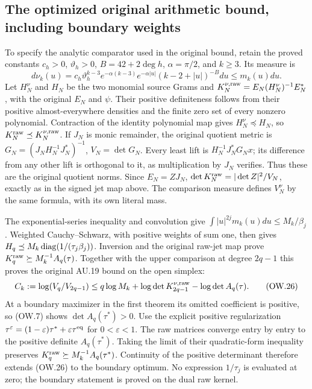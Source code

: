 \subsection{The optimized original arithmetic bound, including boundary weights}

To specify the analytic comparator used in the original bound, retain
the proved constants $c_h>0$, $\vartheta_h>0$, $B=42+2\deg h$,
$\alpha=\pi/2$, and $k\ge3$. Its measure is
\[
 d\nu_k(u)=c_h\vartheta_h^{k-3}e^{-\alpha(k-3)}
       e^{-\alpha|u|}(k-2+|u|)^{-B}du\le m_k(u)du.
 \tag{OW.25}
\]
Let $H_N^\nu$ and $H_N$ be the two monomial source Grams and
$K_N^{\nu,\rm raw}=E_N(H_N^\nu)^{-1}E_N^*$, with the
original $E_N$ and $\psi$. Their positive definiteness follows
from their positive almost-everywhere densities and the finite
zero set of every nonzero polynomial. Contraction of the identity
polynomial map gives $H_N^\nu\preceq H_N$, so
$K_N^{\rm raw}\preceq K_N^{\nu,\rm raw}$.
If $J_N$ is monic remainder, the original quotient metric is
$G_N=(J_NH_N^{-1}J_N^*)^{-1}$, $V_N=\det G_N$.
Every least lift is $H_N^{-1}J_N^*G_Nx$; its difference from any
other lift is orthogonal to it, as multiplication by $J_N$ verifies.
Thus these are the original quotient norms. Since $E_N=ZJ_N$,
$\det K_N^{\rm raw}=|\det Z|^2/V_N$, exactly as in the signed
jet map above. The comparison measure defines $V_N^\nu$ by the
same formula, with its own literal mass.

The exponential-series inequality and convolution give
$\int|u|^{2j}m_k(u)du\le M_k/\beta_j$.
Weighted Cauchy--Schwarz, with positive weights of sum one,
then gives $H_q\preceq M_k\operatorname{diag}(1/(\tau_j\beta_j))$.
Inversion and the original raw-jet map prove
$K_q^{\rm raw}\succeq M_k^{-1}A_q(\tau)$.
Together with the upper comparison at degree $2q-1$ this proves
the original AU.19 bound on the open simplex:
\[
 C_k:=\log(V_q/V_{2q-1})
 \le q\log M_k+\log\det K_{2q-1}^{\nu,\rm raw}
                    -\log\det A_q(\tau).               \tag{OW.26}
\]
At a boundary maximizer in the first theorem its omitted coefficient
is positive, so (OW.7) shows $\det A_q(\tau^*)>0$.
Use the explicit positive regularization
$\tau^\varepsilon=(1-\varepsilon)\tau^*
+\varepsilon\tau^{\rm eq}$ for $0<\varepsilon<1$.
The raw matrices converge entry by entry to the positive definite
$A_q(\tau^*)$. Taking the limit of their quadratic-form inequality
preserves $K_q^{\rm raw}\succeq M_k^{-1}A_q(\tau^*)$.
Continuity of the positive determinant therefore extends (OW.26)
to the boundary optimum. No expression $1/\tau_j$ is evaluated
at zero; the boundary statement is proved on the dual raw kernel.

